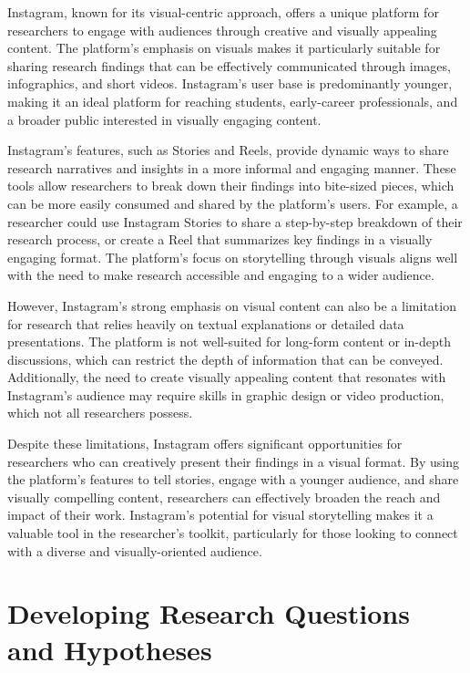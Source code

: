 \documentclass[
]{book}
\begin{document}
Instagram, known for its visual-centric approach, offers a unique platform for researchers to engage with audiences through creative and visually appealing content. The platform's emphasis on visuals makes it particularly suitable for sharing research findings that can be effectively communicated through images, infographics, and short videos. Instagram's user base is predominantly younger, making it an ideal platform for reaching students, early-career professionals, and a broader public interested in visually engaging content.

Instagram's features, such as Stories and Reels, provide dynamic ways to share research narratives and insights in a more informal and engaging manner. These tools allow researchers to break down their findings into bite-sized pieces, which can be more easily consumed and shared by the platform's users. For example, a researcher could use Instagram Stories to share a step-by-step breakdown of their research process, or create a Reel that summarizes key findings in a visually engaging format. The platform's focus on storytelling through visuals aligns well with the need to make research accessible and engaging to a wider audience.

However, Instagram's strong emphasis on visual content can also be a limitation for research that relies heavily on textual explanations or detailed data presentations. The platform is not well-suited for long-form content or in-depth discussions, which can restrict the depth of information that can be conveyed. Additionally, the need to create visually appealing content that resonates with Instagram's audience may require skills in graphic design or video production, which not all researchers possess.

Despite these limitations, Instagram offers significant opportunities for researchers who can creatively present their findings in a visual format. By using the platform's features to tell stories, engage with a younger audience, and share visually compelling content, researchers can effectively broaden the reach and impact of their work. Instagram's potential for visual storytelling makes it a valuable tool in the researcher's toolkit, particularly for those looking to connect with a diverse and visually-oriented audience.

\chapter{Developing Research Questions and Hypotheses}\label{developing-research-questions-and-hypotheses}
\end{document}
